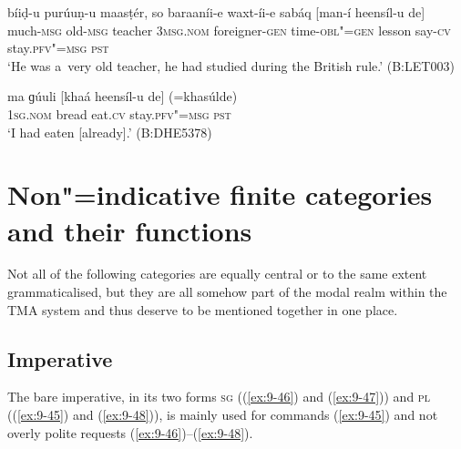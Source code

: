 \begin{exe}
\ex
\label{ex:9-43}
\gll bíiḍ-u purúuṇ-u maasṭér, so baraaníi-e waxt-íi-e sabáq [man-í heensíl-u de] \\
much-\textsc{msg} old-\textsc{msg} teacher 3\textsc{msg.nom}  foreigner-\textsc{gen}
time-\textsc{obl"=gen} lesson say-\textsc{cv} stay.\textsc{pfv"=msg} \textsc{pst} \\
\glt `He was a~very old teacher, he had studied during the British rule.' (B:LET003)

\ex
\label{ex:9-44}
\gll ma ɡúuli [khaá heensíl-u de] (=khasúlde) \\
\textsc{1sg.nom} bread eat.\textsc{cv} stay.\textsc{pfv"=msg} \textsc{pst}  \\
\glt `I had eaten [already].' (B:DHE5378)
\end{exe}

\section{Non"=indicative finite categories and their functions}
\label{sec:9-2}


Not all of the following categories are equally central or to the same extent grammaticalised, but they are all somehow part of the modal realm within the TMA system and thus deserve to be mentioned together in one place.


\subsection{Imperative}
\label{subsec:9-2-1}

The bare imperative, in its two forms \textsc{sg} ((\ref{ex:9-46}) and (\ref{ex:9-47})) and \textsc{pl (}(\ref{ex:9-45}) and (\ref{ex:9-48})\textsc{)}, is mainly used for commands (\ref{ex:9-45}) and not overly polite requests (\ref{ex:9-46})--(\ref{ex:9-48}).

